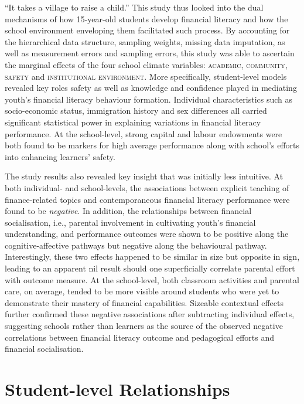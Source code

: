 \documentclass[a4paper,11pt,UKenglish,twoside,openright]{report}\usepackage[]{graphicx}\usepackage[]{color}
\begin{document}
``It takes a village to raise a child.'' This study thus looked into the dual mechanisms of how 15-year-old students develop financial literacy and how the school environment enveloping them facilitated such process. By accounting for the hierarchical data structure, sampling weights, missing data imputation, as well as measurement errors and sampling errors, this study was able to ascertain the marginal effects of the four school climate variables: \textsc{academic}, \textsc{community}, \textsc{safety} and \textsc{institutional environment}. More specifically, student-level models revealed key roles safety as well as knowledge and confidence played in mediating youth's financial literacy behaviour formation. Individual characteristics such as socio-economic status, immigration history and sex differences all carried significant statistical power in explaining variations in financial literacy performance. At the school-level, strong capital and labour endowments were both found to be markers for high average performance along with school's efforts into enhancing learners' safety.

The study results also revealed key insight that was initially less intuitive. At both individual- and school-levels, the associations between explicit teaching of finance-related topics and contemporaneous financial literacy performance were found to be \emph{negative}. In addition, the relationships between financial socialisation, i.e., parental involvement in cultivating youth's financial understanding, and performance outcomes were shown to be positive along the cognitive-affective pathways but negative along the behavioural pathway. Interestingly, these two effects happened to be similar in size but opposite in sign, leading to an apparent nil result should one superficially correlate parental effort with outcome measure. At the school-level, both classroom activities and parental care, on average, tended to be more visible around students who were yet to demonstrate their mastery of financial capabilities. Sizeable contextual effects further confirmed these negative associations after subtracting individual effects, suggesting schools rather than learners as the source of the observed negative correlations between financial literacy outcome and pedagogical efforts and financial socialisation.

\section{Student-level Relationships}
\end{document}
